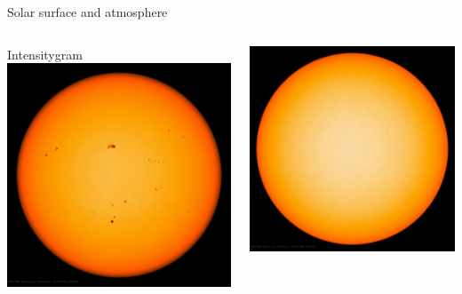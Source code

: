 \begin{frame}[plain,c,label=wavelengths]{Solar surface and atmosphere}{}
	\begin{columns}[c]
		
		\centering \small Intensitygram
		\includegraphics[width=\textwidth]{../talk_figures/20130516_170000_1024_HMIIC.jpg}
		
		\includegraphics[width=\textwidth]{../talk_figures/20181028_120000_1024_HMIIC.jpg}


\end{columns}
\end{frame}
